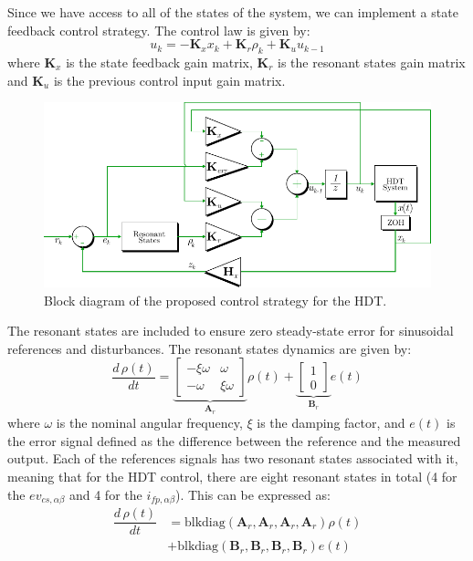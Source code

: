 Since we have access to all of the states of the system, we can implement a state feedback control strategy. The control law is given by:
\begin{equation}
    u_k = -\mathbf{K}_x x_k + \mathbf{K}_r \rho_k + \mathbf{K}_u u_{k - 1}
\end{equation}
where $\mathbf{K}_x$ is the state feedback gain matrix, $\mathbf{K}_r$ is the resonant states gain matrix and $\mathbf{K}_u$ is the previous control input gain matrix.

\begin{figure}[t!]
    \centering
    \includegraphics[width=\columnwidth]{Images/Control_Diagram.pdf} 
    \caption{Block diagram of the proposed control strategy for the HDT.}
    \label{fig:Control_Diagram}
\end{figure}

The resonant states are included to ensure zero steady-state error for sinusoidal references and disturbances. The resonant states dynamics are given by:
\begin{equation}
    \dfrac{d\,\rho(t)}{dt} = 
    \underbrace{
    \begin{bmatrix}
        -\xi\omega & \omega \\
        -\omega & \xi\omega
    \end{bmatrix}
    }_{\mathbf{A}_r}
    \rho(t) + 
    \underbrace{
    \begin{bmatrix}
        1\\
        0
    \end{bmatrix}
    }_{\mathbf{B}_r}
    e(t)
\end{equation}
where $\omega$ is the nominal angular frequency, $\xi$ is the damping factor, and $e(t)$ is the error signal defined as the difference between the reference and the measured output. Each of the references signals has two resonant states associated with it, meaning that for the HDT control, there are eight resonant states in total (4 for the $ev_{cs,\alpha\beta}$ and 4 for the $i_{fp,\alpha\beta}$). This can be expressed as:
\begin{align}
    \dfrac{d\,\rho(t)}{dt} &= \text{blkdiag}(\mathbf{A}_r, \mathbf{A}_r, \mathbf{A}_r, \mathbf{A}_r)\rho(t)\\
    &+ \text{blkdiag}(\mathbf{B}_r, \mathbf{B}_r, \mathbf{B}_r, \mathbf{B}_r)e(t)
\end{align}

